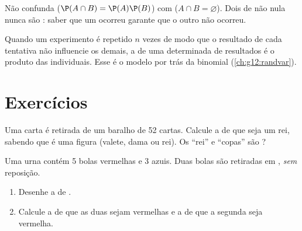 \begin{remark}
Não confunda \emph{} ($\P(A\cap B) = \P(A)\P(B)$) com
\emph{} ($A \cap B = \varnothing$). Dois 
 de  não nula nunca são : saber que
um ocorreu garante que o outro não ocorreu.
\end{remark}

\begin{definition}\label{def:g12:condprob:repet}
Quando um experimento é repetido $n$ vezes de modo que o resultado de cada
tentativa não influencie os demais, a  de uma 
determinada de resultados é o produto das  individuais. Esse
é o modelo por trás da  binomial (\cref{ch:g12:randvar}).
\end{definition}

\section{Exercícios}

\begin{exercise}[$\star$]\label{exo:g12:condprob:1}
Uma carta é retirada de um baralho de 52 cartas. Calcule a 
de que seja um rei, sabendo que é uma figura (valete, dama ou rei). Os
 ``rei'' e ``copas'' são ?
\end{exercise}

\begin{exercise}[$\star$]\label{exo:g12:condprob:2}
Uma urna contém 5 bolas vermelhas e 3 azuis. Duas bolas são retiradas em
, \emph{sem} reposição.
\begin{enumerate}
  \item Desenhe a  de .
  \item Calcule a  de que as duas sejam vermelhas e a
         de que a segunda seja vermelha.
\end{enumerate}
\end{exercise}

